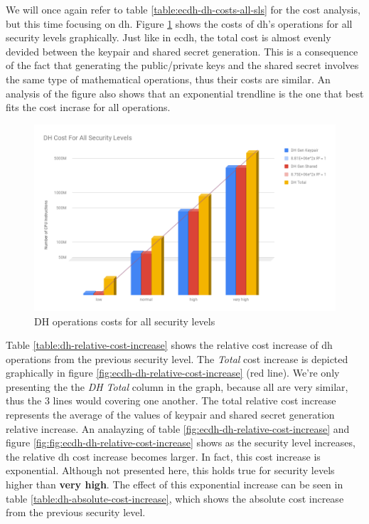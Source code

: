 \documentclass{llncs}
\begin{document}
We will once again refer to table \ref{table:ecdh-dh-costs-all-sls} for the cost analysis, but this time focusing on \gls{dh}. Figure
\ref{fig:dh-costs-all-sls} shows the costs of \gls{dh}'s operations for all security levels graphically. Just like in \gls{ecdh}, the total cost
is almost evenly devided between the keypair and shared secret generation. This is a consequence of the fact that generating the public/private keys
and the shared secret involves the same type of mathematical operations, thus their costs are similar. An analysis of the figure
also shows that an exponential trendline is the one that best fits the cost incrase for all operations.

  \begin{figure}
    \centering
    \includegraphics[width=1.0\textwidth]{img/dh_costs_all_sls.png}
    \caption{\label{fig:dh-costs-all-sls} DH operations costs for all security levels}
  \end{figure}

Table \ref{table:dh-relative-cost-increase} shows the relative cost increase of \gls{dh} operations from the previous security level. The \textit{Total} 
cost increase is depicted graphically in figure \ref{fig:ecdh-dh-relative-cost-increase} (red line). We're only presenting the the \textit{DH Total} column 
in the graph, because all are very similar, thus the $3$ lines would covering one another. The total relative cost increase represents the average of the 
values of keypair and shared secret generation relative increase. An analayzing of table \ref{fig:ecdh-dh-relative-cost-increase} and figure
\ref{fig:fig:ecdh-dh-relative-cost-increase} shows as the security level increases, the relative \gls{dh} cost increase becomes larger. In fact,
this cost increase is exponential. Although not presented here, this holds true for security levels higher than \textbf{very high}. 
The effect of this exponential increase can be seen in table \ref{table:dh-absolute-cost-increase}, which shows the absolute cost increase from 
the previous security level.
\end{document}
